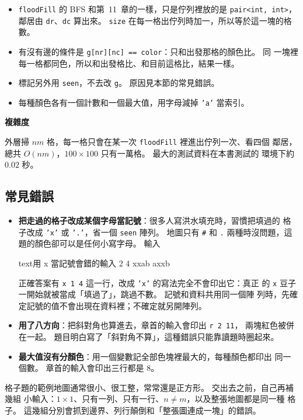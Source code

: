 \begin{itemize}
\item \texttt{floodFill} 的 BFS 和第~11~章的一樣，只是佇列裡放的是
\texttt{pair<int, int>}，鄰居由 \texttt{dr}、\texttt{dc} 算出來。
\texttt{size} 在每一格出佇列時加一，所以等於這一塊的格數。
\item 有沒有邊的條件是 \texttt{g[nr][nc] == color}：只和出發那格的顏色比。 同
一塊裡每一格都同色，所以和出發格比、和目前這格比，結果一樣。
\item 標記另外用 \texttt{seen}，不去改 \texttt{g}。 原因見本節的常見錯誤。
\item 每種顏色各有一個計數和一個最大值，用字母減掉 \texttt{'a'} 當索引。
\end{itemize}

\textbf{複雜度}

外層掃 $nm$ 格，每一格只會在某一次 \texttt{floodFill} 裡進出佇列一次、看四個
鄰居，總共 $O(nm)$，$100 \times 100$ 只有一萬格。 最大的測試資料在本書測試的
環境下約 $0.02$ 秒。

\subsection{常見錯誤}

\begin{itemize}
\item \textbf{把走過的格子改成某個字母當記號}：很多人寫洪水填充時，習慣把填過的
格子改成 \texttt{'x'} 或 \texttt{'.'}，省一個 \texttt{seen} 陣列。 地圖只有
\texttt{\#} 和 \texttt{.} 兩種時沒問題，這題的顏色卻可以是任何小寫字母。 輸入
\begin{code}{text}{用 x 當記號會錯的輸入}
2 4
xxab
axxb
\end{code}
正確答案有 \texttt{x 1 4} 這一行，改成 \texttt{'x'} 的寫法完全不會印出它：真正
的 \texttt{x} 豆子一開始就被當成「填過了」，跳過不數。 記號和資料共用同一個陣
列時，先確定記號的值不會出現在資料裡；不確定就另開陣列。
\item \textbf{用了八方向}：把斜對角也算進去，章首的輸入會印出 \texttt{r 2 11}，
兩塊紅色被併在一起。 題目明白寫了「斜對角不算」，這種錯誤只能靠讀題時圈起來。
\item \textbf{最大值沒有分顏色}：用一個變數記全部色塊裡最大的，每種顏色都印出
同一個數。 章首的輸入會印出三行都是 $8$。
\end{itemize}

\begin{apcsnote}
格子題的範例地圖通常很小、很工整，常常還是正方形。 交出去之前，自己再補幾組
小輸入：$1 \times 1$、只有一列、只有一行、$n \ne m$，以及整張地圖都是同一種
格子。 這幾組分別會抓到邊界、列行顛倒和「整張圖連成一塊」的錯誤。
\end{apcsnote}

